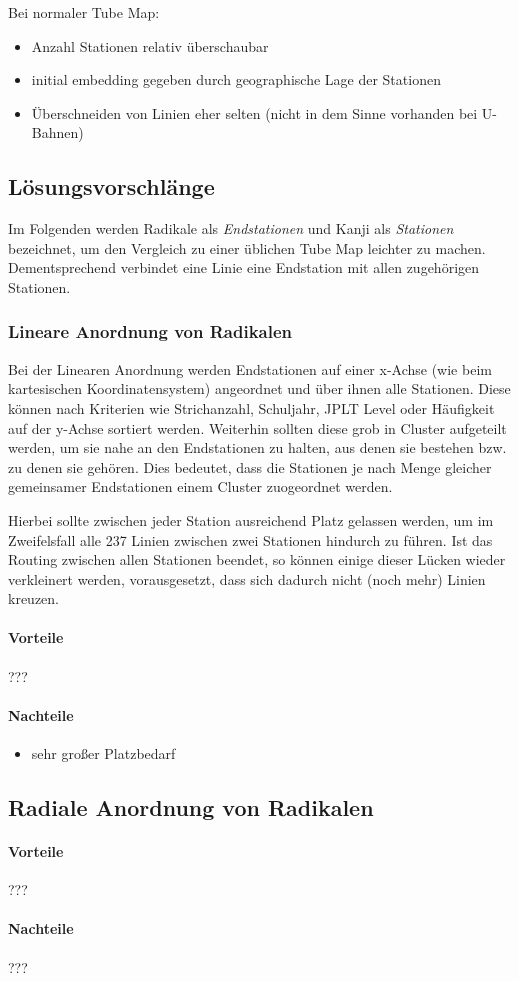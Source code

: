 Bei normaler Tube Map:
\begin{itemize}
\item Anzahl Stationen relativ überschaubar
\item initial embedding gegeben durch geographische Lage der Stationen
\item Überschneiden von Linien eher selten (nicht in dem Sinne vorhanden bei U-Bahnen)
\end{itemize}

\subsection{Lösungsvorschlänge}
Im Folgenden werden Radikale als \emph{Endstationen} und Kanji als \emph{Stationen} bezeichnet, um den Vergleich zu einer üblichen Tube Map leichter zu machen. Dementsprechend verbindet eine Linie eine Endstation mit allen zugehörigen Stationen.
\subsubsection{Lineare Anordnung von Radikalen}
Bei der Linearen Anordnung werden Endstationen auf einer x-Achse (wie beim kartesischen Koordinatensystem) angeordnet und über ihnen alle Stationen. Diese können nach Kriterien wie Strichanzahl, Schuljahr, JPLT Level oder Häufigkeit auf der y-Achse sortiert werden. Weiterhin sollten diese grob in Cluster aufgeteilt werden, um sie nahe an den Endstationen zu halten, aus denen sie bestehen bzw. zu denen sie gehören. Dies bedeutet, dass die Stationen je nach Menge gleicher gemeinsamer Endstationen einem Cluster zuogeordnet werden.

Hierbei sollte zwischen jeder Station ausreichend Platz gelassen werden, um im Zweifelsfall alle 237 Linien zwischen zwei Stationen hindurch zu führen. Ist das Routing zwischen allen Stationen beendet, so können einige dieser Lücken wieder verkleinert werden, vorausgesetzt, dass sich dadurch nicht (noch mehr) Linien kreuzen. 

\paragraph{Vorteile}
???

\paragraph{Nachteile}
\begin{itemize}
\item sehr großer Platzbedarf
\end{itemize}

\subsection{Radiale Anordnung von Radikalen}

\paragraph{Vorteile}
???

\paragraph{Nachteile}
???